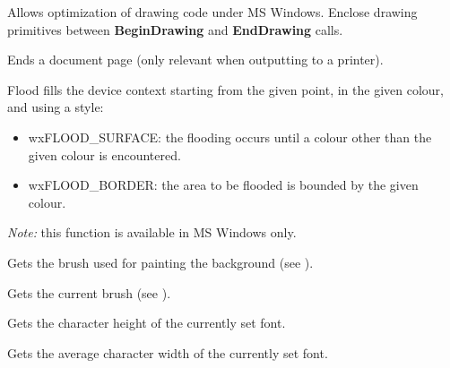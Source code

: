 
Allows optimization of drawing code under MS Windows. Enclose
drawing primitives between {\bf BeginDrawing} and {\bf EndDrawing}\rtfsp
calls.



Ends a document page (only relevant when outputting to a printer).



Flood fills the device context starting from the given point, in the given colour,
and using a style:

\begin{itemize}\itemsep=0pt
\item wxFLOOD\_SURFACE: the flooding occurs until a colour other than the given colour is encountered.
\item wxFLOOD\_BORDER: the area to be flooded is bounded by the given colour.
\end{itemize}

{\it Note:} this function is available in MS Windows only.



Gets the brush used for painting the background (see ).



Gets the current brush (see ).



Gets the character height of the currently set font.



Gets the average character width of the currently set font.



